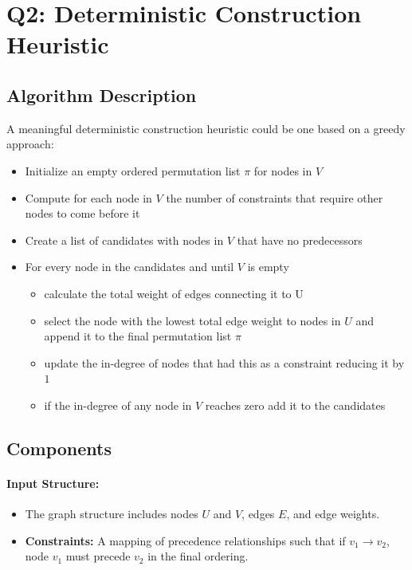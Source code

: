 \documentclass{article}
\begin{document}
\section*{Q2: Deterministic Construction Heuristic}

\subsection*{Algorithm Description}

A meaningful deterministic construction heuristic could be one based on a greedy approach:
\begin{itemize}
    \item Initialize an empty ordered permutation list $\pi$ for nodes in $V$
    \item Compute for each node in $V$ the number of constraints that require other nodes to come before it
    \item Create a list of candidates with nodes in $V$ that have no predecessors
    \item For every node in the candidates and until $V$ is empty
    \begin{itemize}
        \item calculate the total weight of edges connecting it to U
        \item select the node with the lowest total edge weight to nodes in $U$ and append it to the final permutation list $\pi$
        \item  update the in-degree of nodes that had this as a constraint reducing it by $1$
        \item if the in-degree of any node in $V$ reaches zero add it to the candidates
        
    \end{itemize}
\end{itemize}

\subsection*{Components}

\paragraph{Input Structure:}
\begin{itemize}
    \item The graph structure includes nodes \( U \) and \( V \), edges \( E \), and edge weights.
    \item \textbf{Constraints:} A mapping of precedence relationships such that if \( v_1 \to v_2 \), node \( v_1 \) must precede \( v_2 \) in the final ordering.
\end{itemize}
\end{document}

